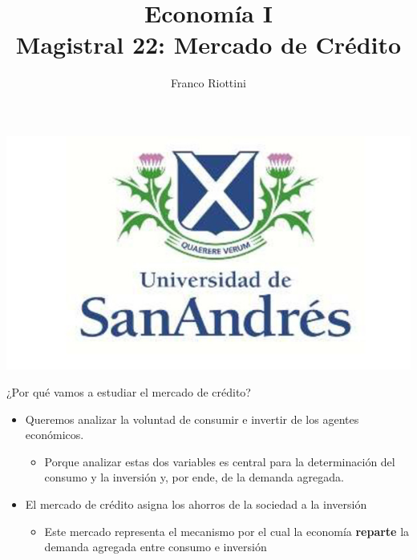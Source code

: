 \documentclass{beamer}
\title[Economía I]{Economía I \vspace{4mm}
\\ Magistral 22: Mercado de Crédito}
\date{}
\author[Franco Riottini]{Franco Riottini}
\institute[]{Universidad de San Andrés}
\begin{document}
\begin{frame}
\titlepage
\centering

\includegraphics[scale=0.2]{../Figures/logoUDESA.jpg} 
\end{frame}

\begin{frame}{¿Por qué vamos a estudiar el mercado de crédito?}
    \begin{itemize}
        \item Queremos analizar la voluntad de consumir e invertir de los agentes económicos.
        \begin{itemize}
            \item Porque analizar estas dos variables es central para la determinación del consumo y la inversión y, por ende, de la demanda agregada. 
        \end{itemize}
        \item El mercado de crédito asigna los ahorros de la sociedad a la inversión
        \begin{itemize}
            \item Este mercado representa el mecanismo por el cual la economía \textbf{reparte} la demanda agregada entre consumo e inversión
        \end{itemize}
    \end{itemize}
\end{frame}
\end{document}
